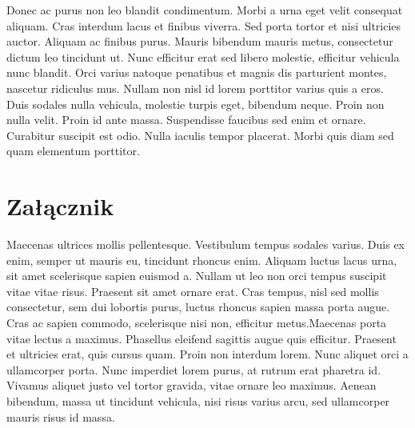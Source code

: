 \documentclass[polish,engineering]{wizthesis}
\begin{document}
Donec ac purus non leo blandit condimentum. Morbi a urna eget velit consequat aliquam. Cras interdum lacus et finibus viverra. Sed porta tortor et nisi ultricies auctor. Aliquam ac finibus purus. Mauris bibendum mauris metus, consectetur dictum leo tincidunt ut. Nunc efficitur erat sed libero molestie, efficitur vehicula nunc blandit.
Orci varius natoque penatibus et magnis dis parturient montes, nascetur ridiculus mus. Nullam non nisl id lorem porttitor varius quis a eros. Duis sodales nulla vehicula, molestie turpis eget, bibendum neque. Proin non nulla velit. Proin id ante massa. Suspendisse faucibus sed enim et ornare. Curabitur suscipit est odio. Nulla iaculis tempor placerat. Morbi quis diam sed quam elementum porttitor.




\listoffigures

\listoftables

\listoflistings

\mainmatter %

\appendixpage

\appendix

\chapter{Załącznik}

Maecenas ultrices mollis pellentesque. Vestibulum tempus sodales varius. Duis ex enim, semper ut mauris eu, tincidunt rhoncus enim. Aliquam luctus lacus urna, sit amet scelerisque sapien euismod a. Nullam ut leo non orci tempus suscipit vitae vitae risus.
Praesent sit amet ornare erat. Cras tempus, nisl sed mollis consectetur, sem dui lobortis purus, luctus rhoncus sapien massa porta augue. Cras ac sapien commodo, scelerisque nisi non, efficitur metus.Maecenas porta vitae lectus a maximus. Phasellus eleifend sagittis augue quis efficitur. Praesent et ultricies erat, quis cursus quam. Proin non interdum lorem.
Nunc aliquet orci a ullamcorper porta. Nunc imperdiet lorem purus, at rutrum erat pharetra id. Vivamus aliquet justo vel tortor gravida, vitae ornare leo maximus. Aenean bibendum, massa ut tincidunt vehicula, nisi risus varius arcu, sed ullamcorper mauris risus id massa.
\end{document}
